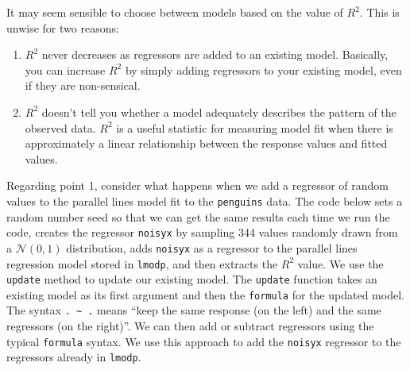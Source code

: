 \documentclass[
]{book}
\newenvironment{Shaded}{\begin{snugshade}}{\end{snugshade}}
\newcommand{\CommentTok}[1]{\textcolor[rgb]{0.56,0.35,0.01}{\textit{#1}}}
\newcommand{\DecValTok}[1]{\textcolor[rgb]{0.00,0.00,0.81}{#1}}
\newcommand{\DocumentationTok}[1]{\textcolor[rgb]{0.56,0.35,0.01}{\textbf{\textit{#1}}}}
\newcommand{\FunctionTok}[1]{\textcolor[rgb]{0.00,0.00,0.00}{#1}}
\newcommand{\NormalTok}[1]{#1}
\newcommand{\OtherTok}[1]{\textcolor[rgb]{0.56,0.35,0.01}{#1}}
\newcommand{\SpecialCharTok}[1]{\textcolor[rgb]{0.00,0.00,0.00}{#1}}
\providecommand{\tightlist}{%
  \setlength{\itemsep}{0pt}\setlength{\parskip}{0pt}}
\theoremstyle{definition}
\theoremstyle{definition}
\theoremstyle{definition}
\theoremstyle{definition}
\theoremstyle{remark}
\begin{document}
\begin{Shaded}
\end{Shaded}

It may seem sensible to choose between models based on the value of \(R^2\). This is unwise for two reasons:

\begin{enumerate}
\def\labelenumi{\arabic{enumi}.}
\tightlist
\item
  \(R^2\) never decreases as regressors are added to an existing model. Basically, you can increase \(R^2\) by simply adding regressors to your existing model, even if they are non-sensical.
\item
  \(R^2\) doesn't tell you whether a model adequately describes the pattern of the observed data. \(R^2\) is a useful statistic for measuring model fit when there is approximately a linear relationship between the response values and fitted values.
\end{enumerate}

Regarding point 1, consider what happens when we add a regressor of random values to the parallel lines model fit to the \texttt{penguins} data. The code below sets a random number seed so that we can get the same results each time we run the code, creates the regressor \texttt{noisyx} by sampling 344 values randomly drawn from a \(\mathcal{N}(0,1)\) distribution, adds \texttt{noisyx} as a regressor to the parallel lines regression model stored in \texttt{lmodp}, and then extracts the \(R^2\) value. We use the \texttt{update} method to update our existing model. The \texttt{update} function takes an existing model as its first argument and then the \texttt{formula} for the updated model. The syntax \texttt{.\ \textasciitilde{}\ .} means ``keep the same response (on the left) and the same regressors (on the right)''. We can then add or subtract regressors using the typical \texttt{formula} syntax. We use this approach to add the \texttt{noisyx} regressor to the regressors already in \texttt{lmodp}.

\begin{Shaded}
\end{Shaded}
\end{document}
